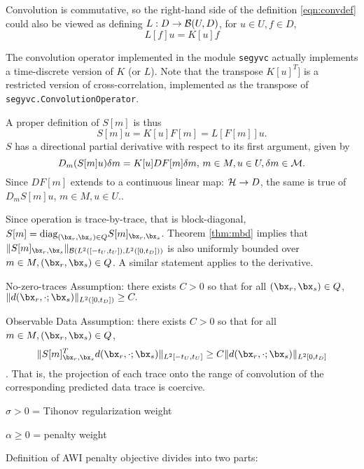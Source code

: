 Convolution is commutative, so the right-hand side of the definition \ref{eqn:convdef} could also be viewed as defining $L: D \rightarrow {\cal B}(U,D)$, for $u \in U, f \in D$,
\begin{equation}
  \label{eqn:altconvdef}
  L[f]u = K[u]f
\end{equation}

The convolution operator implemented in the module {\tt segyvc} actually implements a time-discrete version of $K$ (or $L$). Note that the transpose $K[u]^T]$ is a restricted version of cross-correlation, implemented as the transpose of {\tt segyvc.ConvolutionOperator}.

A proper definition of $S[m]$ is thus
\begin{equation}
  \label{eqn:sdef}
  S[m]u = K[u]F[m] = L[F[m]]u.
\end{equation}
$S$ has a directional partial derivative with respect to its first argument, given by
\begin{equation}
  \label{eqn:dsdef}
  D_m(S[m]u) \delta m = K[u]DF[m] \delta m,\,m\in M, u \in U, \delta m \in {\cal M}.
\end{equation}
Since $DF[m]$ extends to a continuous linear map: ${\cal H} \rightarrow D$, the same is true of $D_mS[m]u$, $m \in M, u \in U$..

Since operation is trace-by-trace, that is block-diagonal, $S[m] = \mbox{diag}_{(\bx_r,\bx_s) \in Q}S[m]_{\bx_r,\bx_s}$. Theorem \ref{thm:mbd} implies that $\|S[m]_{\bx_r,\bx_s}\|_{{\cal B}(L^2([-t_U,t_U]),L^2([0,t_D]))}$ is also uniformly bounded over $m \in M, (\bx_r,\bx_s) \in Q$. A similar statement applies to the derivative.

No-zero-traces Assumption: there exists $C>0$ so that for all $(\bx_r,\bx_s) \in Q$,
$\|d(\bx_r,\cdot;\bx_s)\|_{L^2([0,t_D])} \ge C.$

Observable Data Assumption: there exists $C>0$ so that for all $m \in M, (\bx_r,\bx_s) \in Q$,
\begin{equation}
  \label{eqn:obsdata}
  \|S[m]_{\bx_r,\bx_s}^Td(\bx_r,\cdot;\bx_s)\|_{L^2[-t_U,t_U]} \ge C \|d(\bx_r,\cdot;\bx_s)\|_{L^2[0,t_D]}
\end{equation}.
That is, the projection of each trace onto the range of convolution of the corresponding predicted data trace is coercive.  

$\sigma > 0$ = Tihonov regularization weight

$\alpha \ge 0$ = penalty weight

Definition of AWI penalty objective divides into two parts:

